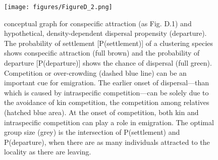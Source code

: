 \documentclass[10pt, twoside]{book} %
\begin{document}
	\begin{figure}[ht!]
		\begin{center}
			\texttt{[image: figures/FigureD\_2.png]}
		\end{center}
		\begin{footnotesize}
			\caption{conceptual graph for conspecific attraction (as Fig. D.1) and hypothetical, density-dependent dispersal propensity (departure). The probability of settlement [P(settlement)] of a clustering species shows conspecific attraction (full brown) and the probability of departure [P(departure)] shows the chance of dispersal (full green). Competition or over-crowding (dashed blue line) can be an important cue for emigration. The earlier onset of dispersal---than which is caused by intraspecific competition---can be solely due to the avoidance of kin competition, the competition among relatives (hatched blue area). At the onset of competition, both kin and intraspecific competition can play a role in emigration. The optimal group size (grey) is the intersection of P(settlement) and P(departure), when there are as many individuals attracted to the locality as there are leaving. \label{figD.2}}
		\end{footnotesize}
	\end{figure}
	
\end{document}
